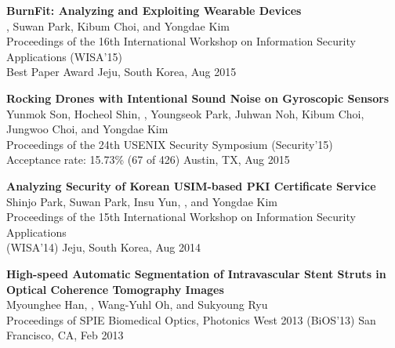 \begin{enumerate}[label={[\arabic*]}, leftmargin=1.5em]
    \item \textbf{BurnFit: Analyzing and Exploiting Wearable Devices} \\
        {\small
            , Suwan Park, Kibum Choi, and Yongdae Kim \\
            Proceedings of the 16th International Workshop on Information Security Applications (WISA'15) \\
            Best Paper Award
        }
        \hfill {\small Jeju, South Korea, Aug 2015}

    \item \textbf{Rocking Drones with Intentional Sound Noise on Gyroscopic Sensors} \\
        {\small
            Yunmok Son, Hocheol Shin, , Youngseok Park, Juhwan Noh, Kibum Choi, Jungwoo Choi, and Yongdae Kim \\
            Proceedings of the 24th USENIX Security Symposium (Security'15) \\
            Acceptance rate: 15.73\% (67 of 426)
        }
        \hfill {\small Austin, TX, Aug 2015}

    \item \textbf{Analyzing Security of Korean USIM-based PKI Certificate Service} \\
        {\small
            Shinjo Park, Suwan Park, Insu Yun, , and Yongdae Kim \\
            Proceedings of the 15th International Workshop on Information Security Applications \\ (WISA'14)
        }
        \hfill {\small Jeju, South Korea, Aug 2014}

    \item \textbf{High-speed Automatic Segmentation of Intravascular Stent Struts in Optical Coherence Tomography Images} \\
        {\small
            Myounghee Han, , Wang-Yuhl Oh, and Sukyoung Ryu \\
            Proceedings of SPIE Biomedical Optics, Photonics West 2013 (BiOS'13)
        }
        \hfill {\small San Francisco, CA, Feb 2013}
\end{enumerate}



